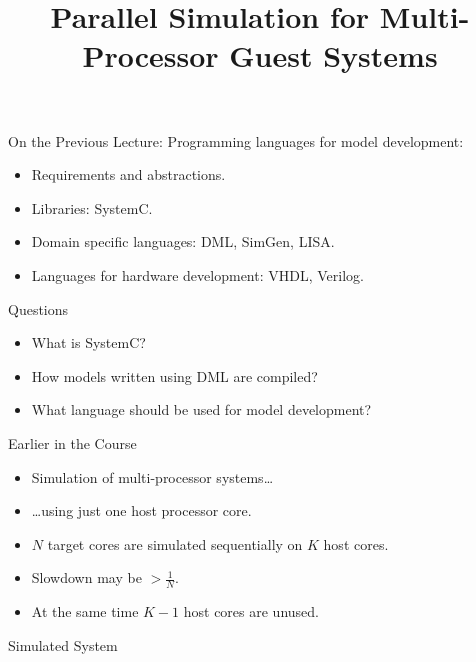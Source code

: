 

\title{Parallel Simulation for Multi-Processor Guest Systems}




\startslides

\begin{frame}{On the Previous Lecture:}
  Programming languages for model development:
  \begin{itemize}
    \item Requirements and abstractions.
    \item Libraries: SystemC.
    \item Domain specific languages: DML, SimGen, LISA.
    \item Languages for hardware development: VHDL, Verilog.
  \end{itemize}
\end{frame}

\begin{frame}{Questions}
  \begin{itemize}
    \item What is SystemC? \pause
    \item How models written using DML are compiled? \pause
    \item What language should be used for model development?
  \end{itemize}
\end{frame}

\begin{frame}{Earlier in the Course}
  \begin{itemize}
   \item Simulation of multi-processor systems\dots\pause
   \item \dots using just one host processor core.
   \vfill
   \item $N$ target cores are simulated sequentially on $K$ host cores.
   \item Slowdown may be $> \frac{1}{N}$.
   \item At the same time $K-1$ host cores are unused.
  \end{itemize}
\end{frame}

\begin{frame}{Simulated System}
  \centering
\end{frame}


